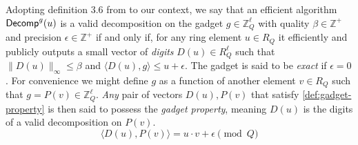 \begin{definition}
    Adopting definition 3.6 from \cite{cryptoeprint:2018/421} to our context, we say that an efficient algorithm $\decomp{u}{g}$ is a valid decomposition on the gadget $g\in \mathbb{Z}_Q^\ell$ with quality $\beta \in \mathbb{Z}^{+}$ and precision $\epsilon \in \mathbb{Z}^+$ if and only if, for any ring element $u\in R_Q$ it efficiently and publicly outputs a small vector of \emph{digits} $D(u) \in R_Q^{\ell}$ such that $\|D(u)\|_\infty \leq \beta$ and $\langle D(u), g\rangle \leq u + \epsilon$. The gadget is said to be \emph{exact} if $\epsilon = 0$. For convenience we might define $g$ as a function of another element $v\in R_Q$ such that $g=P(v)\in \mathbb{Z}_Q^\ell$. \textit{Any} pair of vectors $D(u), P(v)$ that satisfy \eqref{def:gadget-property} is then said to possess the \emph{gadget property}, meaning $D(u)$ is the digits of a valid decomposition on $P(v)$.
    \begin{equation}
        \label{def:gadget-property}
        \langle D(u), P(v)\rangle = u\cdot v + \epsilon \pmod{Q}
    \end{equation}
\end{definition}



